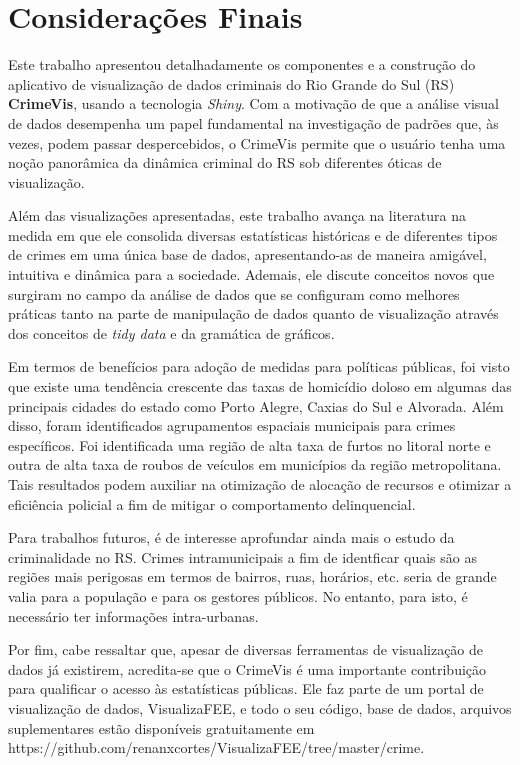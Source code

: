 \documentclass[12pt,openright,oneside,a4paper,english,french,spanish]{abntex2}
\numberwithin{table}{section} %
\numberwithin{figure}{section} %
\begin{document}
\section{Considerações Finais\label{sec:consideracoes_finais}}

Este trabalho apresentou detalhadamente os componentes e a construção do aplicativo de visualização de dados criminais do Rio Grande do Sul (RS) \textbf{CrimeVis}, usando a tecnologia \textit{Shiny}. Com a motivação de que a análise visual de dados desempenha um papel fundamental na investigação de padrões que, às vezes, podem passar despercebidos, o CrimeVis permite que o usuário tenha uma noção panorâmica da dinâmica criminal do RS sob diferentes óticas de visualização.

Além das visualizações apresentadas, este trabalho avança na literatura na medida em que ele consolida diversas estatísticas históricas e de diferentes tipos de crimes em uma única base de dados, apresentando-as de maneira amigável, intuitiva e dinâmica para a sociedade. Ademais, ele discute conceitos novos que surgiram no campo da análise de dados que se configuram como melhores práticas tanto na parte de manipulação de dados quanto de visualização através dos conceitos de \textit{tidy data} e da gramática de gráficos.

Em termos de benefícios para adoção de medidas para políticas públicas, foi visto que existe uma tendência crescente das taxas de homicídio doloso em algumas das principais cidades do estado como Porto Alegre, Caxias do Sul e Alvorada. Além disso, foram identificados agrupamentos espaciais municipais para crimes específicos. Foi identificada uma região de alta taxa de furtos no litoral norte e outra de alta taxa de roubos de veículos em municípios da região metropolitana. Tais resultados podem auxiliar na otimização de alocação de recursos e otimizar a eficiência policial a fim de mitigar o comportamento delinquencial.

Para trabalhos futuros, é de interesse aprofundar ainda mais o estudo da criminalidade no RS. Crimes intramunicipais a fim de identficar quais são as regiões mais perigosas em termos de bairros, ruas, horários, etc. seria de grande valia para a população e para os gestores públicos. No entanto, para isto, é necessário ter informações intra-urbanas.

Por fim, cabe ressaltar que, apesar de diversas ferramentas de visualização de dados já existirem, acredita-se que o CrimeVis é uma importante contribuição para qualificar o acesso às estatísticas públicas. Ele faz parte de um portal de visualização de dados, VisualizaFEE, e todo o seu código, base de dados, arquivos suplementares estão disponíveis gratuitamente em https://github.com/renanxcortes/VisualizaFEE/tree/master/crime.
\end{document}
